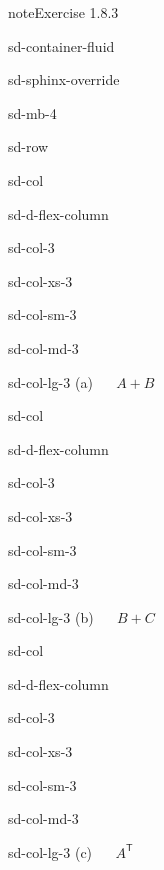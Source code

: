 \documentclass[letterpaper,10pt,english]{jupyterBook}
\begin{document}
\begin{sphinxadmonition}{note}{Exercise 1.8.3}
\begin{sphinxuseclass}{sd-container-fluid}
\begin{sphinxuseclass}{sd-sphinx-override}
\begin{sphinxuseclass}{sd-mb-4}
\begin{sphinxuseclass}{sd-row}
\begin{sphinxuseclass}{sd-col}
\begin{sphinxuseclass}{sd-d-flex-column}
\begin{sphinxuseclass}{sd-col-3}
\begin{sphinxuseclass}{sd-col-xs-3}
\begin{sphinxuseclass}{sd-col-sm-3}
\begin{sphinxuseclass}{sd-col-md-3}
\begin{sphinxuseclass}{sd-col-lg-3}
\sphinxAtStartPar
(a)   \(A + B\)

\end{sphinxuseclass}
\end{sphinxuseclass}
\end{sphinxuseclass}
\end{sphinxuseclass}
\end{sphinxuseclass}
\end{sphinxuseclass}
\end{sphinxuseclass}
\begin{sphinxuseclass}{sd-col}
\begin{sphinxuseclass}{sd-d-flex-column}
\begin{sphinxuseclass}{sd-col-3}
\begin{sphinxuseclass}{sd-col-xs-3}
\begin{sphinxuseclass}{sd-col-sm-3}
\begin{sphinxuseclass}{sd-col-md-3}
\begin{sphinxuseclass}{sd-col-lg-3}
\sphinxAtStartPar
(b)   \(B + C\)

\end{sphinxuseclass}
\end{sphinxuseclass}
\end{sphinxuseclass}
\end{sphinxuseclass}
\end{sphinxuseclass}
\end{sphinxuseclass}
\end{sphinxuseclass}
\begin{sphinxuseclass}{sd-col}
\begin{sphinxuseclass}{sd-d-flex-column}
\begin{sphinxuseclass}{sd-col-3}
\begin{sphinxuseclass}{sd-col-xs-3}
\begin{sphinxuseclass}{sd-col-sm-3}
\begin{sphinxuseclass}{sd-col-md-3}
\begin{sphinxuseclass}{sd-col-lg-3}
\sphinxAtStartPar
(c)   \(A^\mathsf{T}\)


\end{sphinxuseclass}
\end{sphinxuseclass}
\end{sphinxuseclass}
\end{sphinxuseclass}
\end{sphinxuseclass}
\end{sphinxuseclass}
\end{sphinxuseclass}
\end{sphinxuseclass}
\end{sphinxuseclass}
\end{sphinxuseclass}
\end{sphinxuseclass}
\end{sphinxadmonition}
\end{document}
